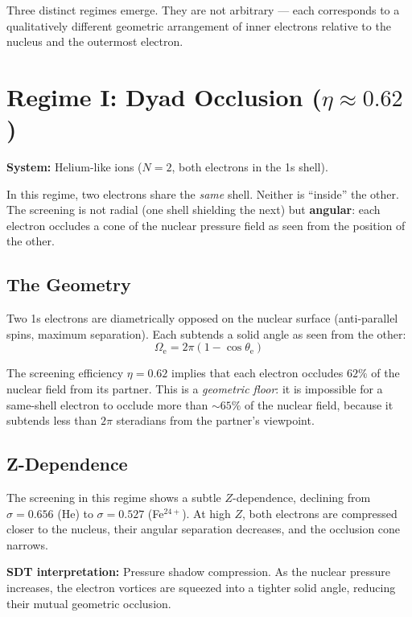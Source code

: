 Three distinct regimes emerge.  They are not arbitrary --- each corresponds to a qualitatively different geometric arrangement of inner electrons relative to the nucleus and the outermost electron.


\section{Regime I: Dyad Occlusion ($\eta \approx 0.62$)}
\label{sec:regime1}

\textbf{System:} Helium-like ions ($N = 2$, both electrons in the 1s shell).

In this regime, two electrons share the \emph{same} shell.  Neither is ``inside'' the other.  The screening is not radial (one shell shielding the next) but \textbf{angular}: each electron occludes a cone of the nuclear pressure field as seen from the position of the other.

\subsection{The Geometry}

Two 1s electrons are diametrically opposed on the nuclear surface (anti-parallel spins, maximum separation).  Each subtends a solid angle as seen from the other:
\begin{equation}
  \Omega_{\text{e}} = 2\pi\left(1 - \cos\theta_{\text{e}}\right)
\end{equation}

The screening efficiency $\eta = 0.62$ implies that each electron occludes $62\%$ of the nuclear field from its partner.  This is a \emph{geometric floor}: it is impossible for a same-shell electron to occlude more than $\sim 65\%$ of the nuclear field, because it subtends less than $2\pi$ steradians from the partner's viewpoint.

\subsection{Z-Dependence}

The screening in this regime shows a subtle $Z$-dependence, declining from $\sigma = 0.656$ (He) to $\sigma = 0.527$ (Fe$^{24+}$).  At high $Z$, both electrons are compressed closer to the nucleus, their angular separation decreases, and the occlusion cone narrows.

\textbf{SDT interpretation:} Pressure shadow compression.  As the nuclear pressure increases, the electron vortices are squeezed into a tighter solid angle, reducing their mutual geometric occlusion.


